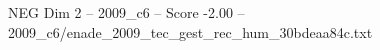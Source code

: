 \begin{textsample}{NEG Dim 2 – 2009\_c6 – Score -2.00 – 2009\_c6/enade\_2009\_tec\_gest\_rec\_hum\_30bdeaa84c.txt}
\end{textsample}

